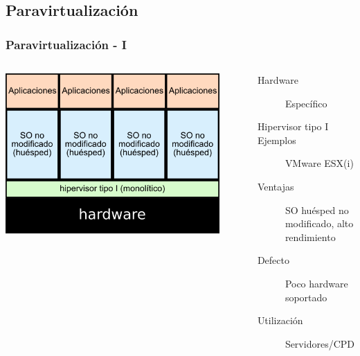 \documentclass{beamer}
\begin{document}
\subsection{Paravirtualización}
\begin{frame} \frametitle{Paravirtualización - I}
  \begin{columns}
    \begin{center}
    \includegraphics[width=0.9\textwidth]{img/paravirt_monolitica.png}      
    \end{center}
    \begin{description}
    \item[Hardware] Específico 
    \item[Hipervisor tipo I]
    \item[Ejemplos] VMware ESX(i)
    \item [Ventajas] SO huésped no modificado, alto rendimiento
    \item[Defecto] Poco hardware soportado
    \item[Utilización] Servidores/CPD
    \end{description}
  \end{columns}
\end{frame}
\end{document}
